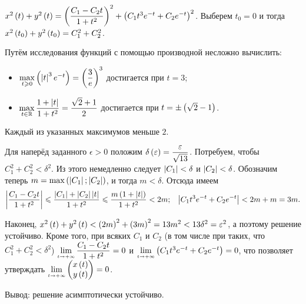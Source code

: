 \documentclass[a5paper,10pt]{article}
\begin{document}
$x^2\left(t\right) + y^2\left(t\right) = \left(\dfrac {C_1 - C_2 t} {1 + t^2}\right)^2 + \left(C_{1} t^3 e^{-t} + C_{2}e^{-t}\right)^2$.
Выберем $t_{0} = 0$ и тогда $x^2\br{t_{0}} + y^2\br{t_{0}} \linebreak = C_{1}^2 + C_{2}^2$.

Путём исследования функций с помощью производной несложно вычислить:
\begin{itemize}
    \item $\max\limits_{t \geqslant 0} \left(\left|t\right|^3 e^{-t}\right) = \left(\dfrac {3} {e}\right)^3$ достигается при $t =3$;
    \item $\max\limits_{t \in {\mathbb{R}}} \dfrac {1 + \left|t\right|} {1 + t^2} = \dfrac {\sqrt{2} + 1} {2}$ достигается при $t = \pm \left(\sqrt{2} - 1\right)$.
\end{itemize}
Каждый из указанных максимумов меньше $2$.

Для наперёд заданного $\epsilon > 0$ положим $\delta\left(\varepsilon\right) = \dfrac {\varepsilon} {\sqrt{13}}$. Потребуем, чтобы $C_{1}^2 + C_{2}^2 < \delta^2$. Из этого немедленно следует $\left|C_{1}\right| < \delta$ и $\left|C_{2}\right| < \delta$. Обозначим теперь $m = \max\left(\left|C_{1}\right|; \left|C_{2}\right|\right)$, и тогда $m < \delta$. Отсюда имеем
\begin{align*}
\left|\dfrac {C_1 - C_2 t} {1 + t^2}\right| \leqslant \dfrac {\left|C_1\right| + \left|C_2\right| \left|t\right|} {1 + t^2} \leqslant \dfrac {m \left(1 + \left|t\right|\right)} {1 + t^2} < 2m; 
&& \left|C_{1} t^3 e^{-t} + C_{2}e^{-t}\right| < 2m + m = 3m.
\end{align*}

Наконец, $x^2\left(t\right) + y^2\left(t\right) < \left(2m\right)^2 + \left(3m\right)^2 = 13m^2 < 13\delta^2 = \varepsilon^2$, а поэтому решение устойчиво.
Кроме того, при всяких $C_{1}$ и $C_{2}$ (в том числе при таких, что $C_{1}^2 + C_{2}^2 < \delta^2$)
$\tlim{\mathsmaller{t \to +\infty}} \dfrac {C_1 - C_2 t} {1 + t^2} = 0$ и $\tlim{\mathsmaller{t \to +\infty}} \br{C_{1} t^3 e^{-t} + C_{2}e^{-t}} = 0$, что позволяет утверждать $\tlim{\mathsmaller{t \to +\infty}} \begin{pmatrix} x\br{t} \\ y\br{t}\end{pmatrix} = 0$.

Вывод: решение асимптотически устойчиво.
\end{document}
